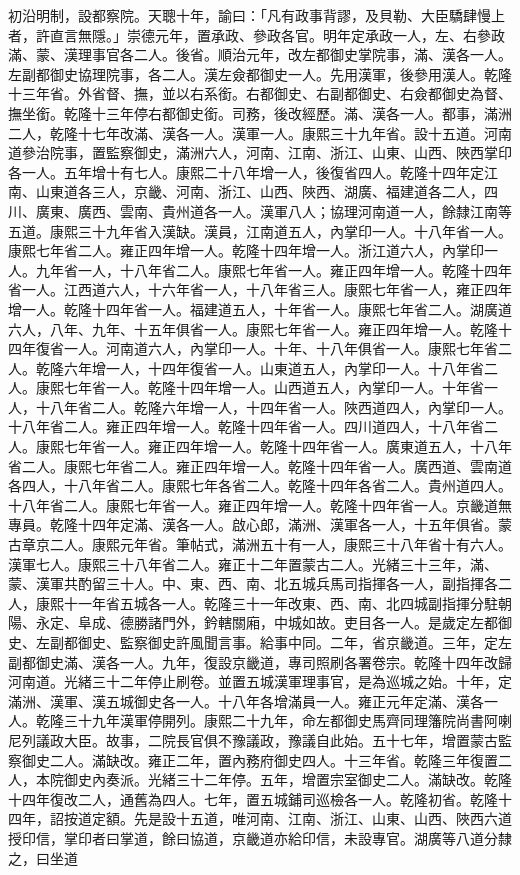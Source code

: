 \begin{pinyinscope}
初沿明制，設都察院。天聰十年，諭曰：「凡有政事背謬，及貝勒、大臣驕肆慢上者，許直言無隱。」崇德元年，置承政、參政各官。明年定承政一人，左、右參政滿、蒙、漢理事官各二人。後省。順治元年，改左都御史掌院事，滿、漢各一人。左副都御史協理院事，各二人。漢左僉都御史一人。先用漢軍，後參用漢人。乾隆十三年省。外省督、撫，並以右系銜。右都御史、右副都御史、右僉都御史為督、撫坐銜。乾隆十三年停右都御史銜。司務，後改經歷。滿、漢各一人。都事，滿洲二人，乾隆十七年改滿、漢各一人。漢軍一人。康熙三十九年省。設十五道。河南道參治院事，置監察御史，滿洲六人，河南、江南、浙江、山東、山西、陜西掌印各一人。五年增十有七人。康熙二十八年增一人，後復省四人。乾隆十四年定江南、山東道各三人，京畿、河南、浙江、山西、陜西、湖廣、福建道各二人，四川、廣東、廣西、雲南、貴州道各一人。漢軍八人；協理河南道一人，餘隸江南等五道。康熙三十九年省入漢缺。漢員，江南道五人，內掌印一人。十八年省一人。康熙七年省二人。雍正四年增一人。乾隆十四年增一人。浙江道六人，內掌印一人。九年省一人，十八年省二人。康熙七年省一人。雍正四年增一人。乾隆十四年省一人。江西道六人，十六年省一人，十八年省三人。康熙七年省一人，雍正四年增一人。乾隆十四年省一人。福建道五人，十年省一人。康熙七年省二人。湖廣道六人，八年、九年、十五年俱省一人。康熙七年省一人。雍正四年增一人。乾隆十四年復省一人。河南道六人，內掌印一人。十年、十八年俱省一人。康熙七年省二人。乾隆六年增一人，十四年復省一人。山東道五人，內掌印一人。十八年省二人。康熙七年省一人。乾隆十四年增一人。山西道五人，內掌印一人。十年省一人，十八年省二人。乾隆六年增一人，十四年省一人。陜西道四人，內掌印一人。十八年省二人。雍正四年增一人。乾隆十四年省一人。四川道四人，十八年省二人。康熙七年省一人。雍正四年增一人。乾隆十四年省一人。廣東道五人，十八年省二人。康熙七年省二人。雍正四年增一人。乾隆十四年省一人。廣西道、雲南道各四人，十八年省二人。康熙七年各省二人。乾隆十四年各省二人。貴州道四人。十八年省二人。康熙七年省一人。雍正四年增一人。乾隆十四年省一人。京畿道無專員。乾隆十四年定滿、漢各一人。啟心郎，滿洲、漢軍各一人，十五年俱省。蒙古章京二人。康熙元年省。筆帖式，滿洲五十有一人，康熙三十八年省十有六人。漢軍七人。康熙三十八年省二人。雍正十二年置蒙古二人。光緒三十三年，滿、蒙、漢軍共酌留三十人。中、東、西、南、北五城兵馬司指揮各一人，副指揮各二人，康熙十一年省五城各一人。乾隆三十一年改東、西、南、北四城副指揮分駐朝陽、永定、阜成、德勝諸門外，鈐轄關廂，中城如故。吏目各一人。是歲定左都御史、左副都御史、監察御史許風聞言事。給事中同。二年，省京畿道。三年，定左副都御史滿、漢各一人。九年，復設京畿道，專司照刷各署卷宗。乾隆十四年改歸河南道。光緒三十二年停止刷卷。並置五城漢軍理事官，是為巡城之始。十年，定滿洲、漢軍、漢五城御史各一人。十八年各增滿員一人。雍正元年定滿、漢各一人。乾隆三十九年漢軍停開列。康熙二十九年，命左都御史馬齊同理籓院尚書阿喇尼列議政大臣。故事，二院長官俱不豫議政，豫議自此始。五十七年，增置蒙古監察御史二人。滿缺改。雍正二年，置內務府御史四人。十三年省。乾隆三年復置二人，本院御史內奏派。光緒三十二年停。五年，增置宗室御史二人。滿缺改。乾隆十四年復改二人，通舊為四人。七年，置五城鋪司巡檢各一人。乾隆初省。乾隆十四年，詔按道定額。先是設十五道，唯河南、江南、浙江、山東、山西、陜西六道授印信，掌印者曰掌道，餘曰協道，京畿道亦給印信，未設專官。湖廣等八道分隸之，曰坐道
\end{pinyinscope}
